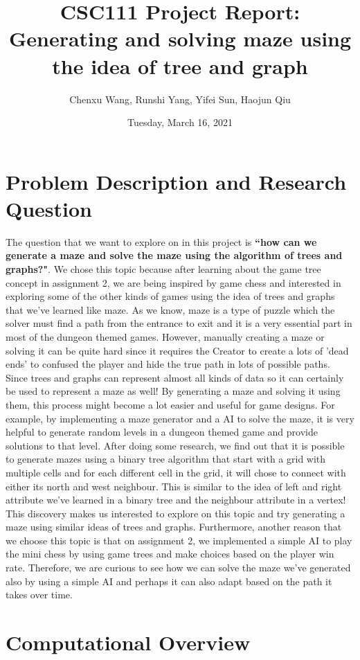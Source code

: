 \documentclass[fontsize=11pt]{article}
\title{CSC111 Project Report: Generating and solving maze using the idea of tree and graph}
\author{Chenxu Wang, Runshi Yang, Yifei Sun, Haojun Qiu}
\date{Tuesday, March 16, 2021}
\begin{document}
\maketitle

\section*{Problem Description and Research Question}

The question that we want to explore on in this project is \textbf{``how can we generate a maze and solve the maze using the algorithm of trees and graphs?"}. We chose this topic because after learning about the game tree concept in assignment 2, we are being inspired by game chess and interested in exploring some of the other kinds of games using the idea of trees and graphs that we've learned like maze. As we know, maze is a type of puzzle which the solver must find a path from the entrance to exit and it is a very essential part in most of the dungeon themed games. However, manually creating a maze or solving it can be quite hard since it requires the Creator to create a lots of 'dead ends' to confused the player and hide the true path in lots of possible paths. Since trees and graphs can represent almost all kinds of data so it can certainly be used to represent a maze as well! By generating a maze and solving it using them, this process might become a lot easier and useful for game designs. For example, by implementing a maze generator and a AI to solve the maze, it is very helpful to generate random levels in a dungeon themed game and provide solutions to that level. After doing some research, we find out that it is possible to generate mazes using a binary tree algorithm that start with a grid with multiple cells and for each different cell in the grid, it will chose to connect with either its north and west neighbour. This is similar to the idea of left and right attribute we've learned in a binary tree and the neighbour attribute in a vertex! This discovery makes us interested to explore on this topic and try generating a maze using similar ideas of trees and graphs. Furthermore, another reason that we choose this topic is that on assignment 2, we implemented a simple AI to play the mini chess by using game trees and make choices based on the player win rate. Therefore, we are curious to see how we can solve the maze we've generated also by using a simple AI and perhaps it can also adapt based on the path it takes over time.


\section*{Computational Overview}
\end{document}
